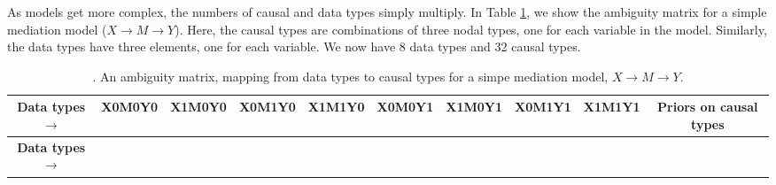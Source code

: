 \documentclass[
  12pt,
]{book}
\begin{document}
As models get more complex, the numbers of causal and data types simply multiply. In Table \ref{tab:ambigmatrixmed}, we show the ambiguity matrix for a simple mediation model (\(X \rightarrow M \rightarrow Y\)). Here, the causal types are combinations of three nodal types, one for each variable in the model. Similarly, the data types have three elements, one for each variable. We now have 8 data types and 32 causal types.

\begin{longtable}[]{@{}cccccccccc@{}}
\caption{\label{tab:ambigmatrixmed}. An ambiguity matrix, mapping from data types to causal types for a simpe mediation model, \(X \rightarrow M \rightarrow Y\).}\tabularnewline
\toprule
\begin{minipage}[b]{0.23\columnwidth}\centering
\textbf{Data types} \(\rightarrow\)\strut
\end{minipage} & \begin{minipage}[b]{0.05\columnwidth}\centering
X0M0Y0\strut
\end{minipage} & \begin{minipage}[b]{0.05\columnwidth}\centering
X1M0Y0\strut
\end{minipage} & \begin{minipage}[b]{0.05\columnwidth}\centering
X0M1Y0\strut
\end{minipage} & \begin{minipage}[b]{0.05\columnwidth}\centering
X1M1Y0\strut
\end{minipage} & \begin{minipage}[b]{0.05\columnwidth}\centering
X0M0Y1\strut
\end{minipage} & \begin{minipage}[b]{0.05\columnwidth}\centering
X1M0Y1\strut
\end{minipage} & \begin{minipage}[b]{0.05\columnwidth}\centering
X0M1Y1\strut
\end{minipage} & \begin{minipage}[b]{0.05\columnwidth}\centering
X1M1Y1\strut
\end{minipage} & \begin{minipage}[b]{0.14\columnwidth}\centering
Priors on causal types\strut
\end{minipage}\tabularnewline
\midrule
\endfirsthead
\toprule
\begin{minipage}[b]{0.23\columnwidth}\centering
\textbf{Data types} \(\rightarrow\)\strut
\end{minipage} & \begin{minipage}[b]{0.05\columnwidth}\centering

\end{minipage}
\end{longtable}
\end{document}
